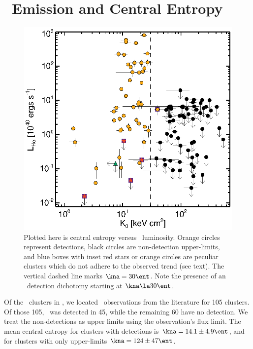 \documentclass{emulateapj}
\begin{document}
\section{\halpha\ Emission and Central Entropy}
\label{sec:sf}

\begin{figure}
  \begin{center}
    \includegraphics*[width=\columnwidth, trim=28mm 7mm 40mm 17mm, clip]{ha}
    \caption{Plotted here is central entropy versus
      \halpha\ luminosity. Orange circles represent detections, black
      circles are non-detection upper-limits, and blue boxes with
      inset red stars or orange circles are peculiar clusters which do
      not adhere to the observed trend (see text). The vertical dashed
      line marks $\kna = 30 \ent$.  Note the presence of an
      \halpha\ detection dichotomy starting at $\kna \la 30 \ent$.}
    \label{fig:ha}
  \end{center}
\end{figure}

Of the \clnum\ clusters in \accept, we located \halpha\ observations
from the literature for 105 clusters. Of those 105, \halpha\ was
detected in 45, while the remaining 60 have no detection. We treat the
non-detections as upper limits using the observation's flux limit.  The
mean central entropy for clusters with detections is $\kna = 14.1 \pm
4.9 \ent$, and for clusters with only upper-limits $\kna = 124 \pm 47
\ent$.
\end{document}

